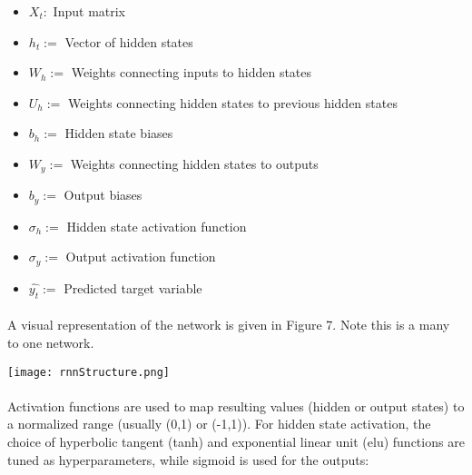 \documentclass[11pt]{article}
\newenvironment{Figure}
  {\par\medskip\noindent\minipage{\linewidth}}
  {\endminipage\par\medskip}
\begin{document}
            \begin{multicols*}{2}

                    \begin{itemize}
                        \item $X_t: $ Input matrix 
                        \item $h_t := $ Vector of hidden states
                        \item $W_h := $ Weights connecting inputs to hidden states
                        \item $U_h := $ Weights connecting hidden states to previous hidden states
                        \item $b_h := $ Hidden state biases
                        \item $W_y := $ Weights connecting hidden states to outputs
                        \item $b_y := $ Output biases
                        \item $\sigma_h := $ Hidden state activation function
                        \item $\sigma_y := $ Output activation function
                        \item $\hat{y_t} := $ Predicted target variable
                    \end{itemize}

                \paragraph{}
                    A visual representation of the network is given in Figure 7. 
                    Note this is a many to one network. 

                \begin{Figure}  
                    \centering
                    \texttt{[image: rnnStructure.png]}
                    \label{fig:Basic RNN Topolgy}
                \end{Figure}

                \vspace{-5pt}

                \paragraph{}
                    Activation functions are used to map resulting values (hidden or output states) to a normalized range (usually (0,1) or (-1,1)).
                    For hidden state activation, the choice of hyperbolic tangent (tanh) and exponential linear unit (elu) functions are tuned as hyperparameters, while sigmoid is used for the outputs:
                    

\end{multicols*}
\end{document}
